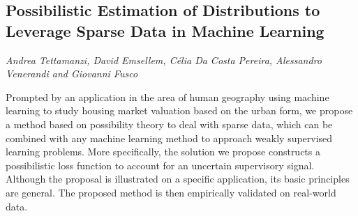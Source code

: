 \documentclass[../booklet.tex]{subfiles}
\begin{document}
\subsection[Possibilistic Estimation of Distributions to Leverage Sparse Data in Machine Learning. {\it Andrea Tettamanzi, David Emsellem, Célia Da Costa Pereira, Alessandro Venerandi and Giovanni Fusco}]{Possibilistic Estimation of Distributions to Leverage Sparse Data in Machine Learning}
    

\begin{center}
  {\it Andrea Tettamanzi, David Emsellem, Célia Da Costa Pereira, Alessandro Venerandi and Giovanni Fusco}
\end{center}



Prompted by an application in the area of human geography using machine learning to
study housing market valuation based on the urban form, we propose a method based on
possibility theory to deal with sparse data, which can be combined with any machine learning
method to approach weakly supervised learning problems.
More specifically, the solution we propose constructs a possibilistic
loss function to account for an uncertain supervisory signal.
Although the proposal is illustrated on a specific application, its basic principles
are general. The proposed method is then empirically validated on real-world data.

\end{document}
